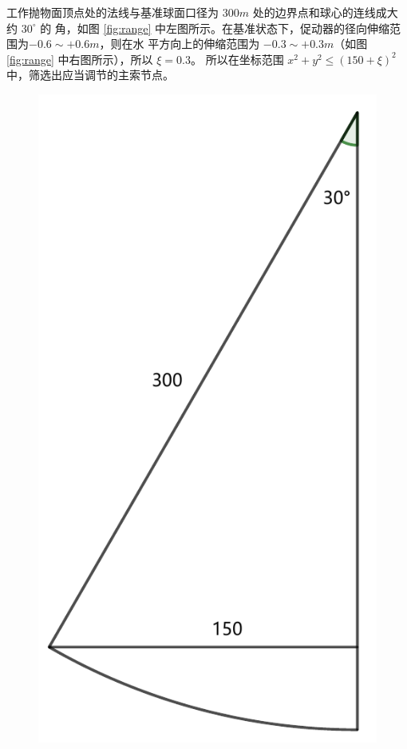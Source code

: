 \documentclass[withoutpreface,bwprint]{cumcmthesis} %
\begin{document}
工作抛物面顶点处的法线与基准球面口径为 $300m$ 处的边界点和球心的连线成大约 $30^\circ$ 的
角，如图 \ref{fig:range} 中左图所示。在基准状态下，促动器的径向伸缩范围为$-0.6\sim +0.6m$，则在水
平方向上的伸缩范围为 $-0.3\sim +0.3m$（如图 \ref{fig:range} 中右图所示），所以 $\xi = 0.3$。
所以在坐标范围 $x^2 + y^2 \leqslant (150 + \xi)^2$ 中，筛选出应当调节的主索节点。
\begin{figure}[!h]
    \centering
    \begin{minipage}[c]{0.48\textwidth}
        \centering
        \includegraphics[height=0.2\textheight]{angle1.pdf}

\end{minipage}
\end{figure}
\end{document}
